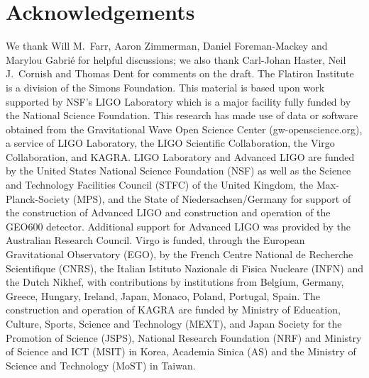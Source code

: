 \documentclass[twocolumn]{aastex631}
\begin{document}
\section{Acknowledgements}
We thank Will M.~Farr, Aaron Zimmerman, Daniel Foreman-Mackey and Marylou Gabri\'e for helpful discussions; we also thank Carl-Johan Haster, Neil J.~Cornish and Thomas Dent for comments on the draft.
The Flatiron Institute is a division of the Simons Foundation.
This material is based upon work supported by NSF's LIGO Laboratory which is a major facility fully funded by the National Science Foundation.
This research has made use of data or software obtained from the Gravitational Wave Open Science Center (gw-openscience.org), a service of LIGO Laboratory, the LIGO Scientific Collaboration, the Virgo Collaboration, and KAGRA. LIGO Laboratory and Advanced LIGO are funded by the United States National Science Foundation (NSF) as well as the Science and Technology Facilities Council (STFC) of the United Kingdom, the Max-Planck-Society (MPS), and the State of Niedersachsen/Germany for support of the construction of Advanced LIGO and construction and operation of the GEO600 detector. Additional support for Advanced LIGO was provided by the Australian Research Council. Virgo is funded, through the European Gravitational Observatory (EGO), by the French Centre National de Recherche Scientifique (CNRS), the Italian Istituto Nazionale di Fisica Nucleare (INFN) and the Dutch Nikhef, with contributions by institutions from Belgium, Germany, Greece, Hungary, Ireland, Japan, Monaco, Poland, Portugal, Spain. The construction and operation of KAGRA are funded by Ministry of Education, Culture, Sports, Science and Technology (MEXT), and Japan Society for the Promotion of Science (JSPS), National Research Foundation (NRF) and Ministry of Science and ICT (MSIT) in Korea, Academia Sinica (AS) and the Ministry of Science and Technology (MoST) in Taiwan.


\end{document}
